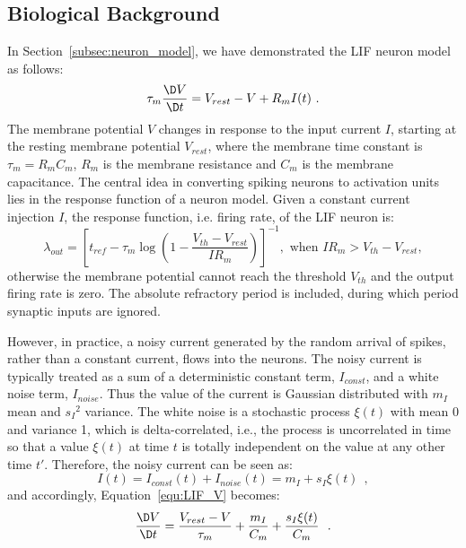 	
	
	\subsection{Biological Background}
	\label{sec:siergert}
	In Section~\ref{subsec:neuron_model}, we have demonstrated the  LIF neuron model as follows:
	\begin{equation}
	\tau_m \frac{\D V}{\D t}=V_{rest} - V + R_{m} I(t) ~.
	\label{equ:LIF_V}
	\end{equation}
	The membrane potential $V$ changes in response to the input current $I$, starting at the resting membrane potential $V_{rest}$, where the membrane time constant is $\tau_m = R_mC_m$, $R_m$ is the membrane resistance and $C_m$ is the membrane capacitance.
	The central idea in converting spiking neurons to activation units lies in the response function of a neuron model.
	Given a constant current injection $I$, the response function, i.e. firing rate, of the LIF neuron is:
	\begin{equation}
	\lambda_\mathit{out}=
	\left [ t_\mathit{ref}-\tau_m\log \left ( 1-\frac{V_{th}-V_\mathit{rest}}{IR_m}  \right )\right ]^{-1}, \textrm{~when~} IR_m>V_{th}-V_{rest},
	\label{equ:consI}
	\end{equation}
	otherwise the membrane potential cannot reach the threshold $V_{th}$ and the output firing rate is zero. 
	The absolute refractory period \DIFdelbegin {}\DIFdelend \DIFaddbegin {}\DIFaddend is included, during which period synaptic inputs are ignored.

	However, in practice, a noisy current generated by the random arrival of spikes, rather than a constant current, flows into the neurons.
	The noisy current is typically treated as a sum of a deterministic constant term, $I_{const}$, and a white noise term, $I_{noise}$.
	Thus the value of the current is Gaussian distributed with $m_I$ mean and ${s_I}^2$ variance.
	The white noise is a stochastic process $\xi(t)$ with mean 0 and variance 1, which is delta-correlated, i.e., the process is uncorrelated in time so that a value $\xi(t)$ at time $t$ is totally independent on the value at any other time $t'$.
	Therefore, the noisy current can be seen as:
	\begin{equation}
	I(t) = I_{const}(t)+I_{noise}(t) = m_I + s_I\xi(t)~~,
	\label{equ:noisyI}
	\end{equation}
	and accordingly, Equation~\ref{equ:LIF_V} becomes:
	\begin{equation}
	\frac{\D V}{\D t}=\frac{V_{rest} - V}{\tau_m } + \frac{m_I}{C_m} + \frac{s_I\xi(t)}{C_m}~~.
	\label{equ:LIF_V2}
	\end{equation}


